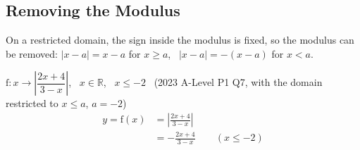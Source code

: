 \documentclass[a4paper,11pt,oneside]{book}
\begin{document}
\clearpage
\subsection{Removing the Modulus}
On a restricted domain, the sign inside the modulus is fixed, so the modulus can be removed: $|x-a|=x-a$ for $x\geqslant a$, \ $|x-a|=-(x-a)$ for $x<a$.\par\smallskip
\exlab $\mathrm{f}:x\to\left|\dfrac{2x+4}{3-x}\right|$, \ $x\in\mathbb{R}$, \ $x\leqslant-2$ \ {\small(2023 A-Level P1 Q7, with the domain restricted to $x\leqslant a$, $a=-2$)}
\begin{align*}
y=\mathrm{f}(x)&=\left|\frac{2x+4}{3-x}\right|\\
&=-\frac{2x+4}{3-x}\qquad(x\leqslant-2)
\end{align*}
\end{document}

